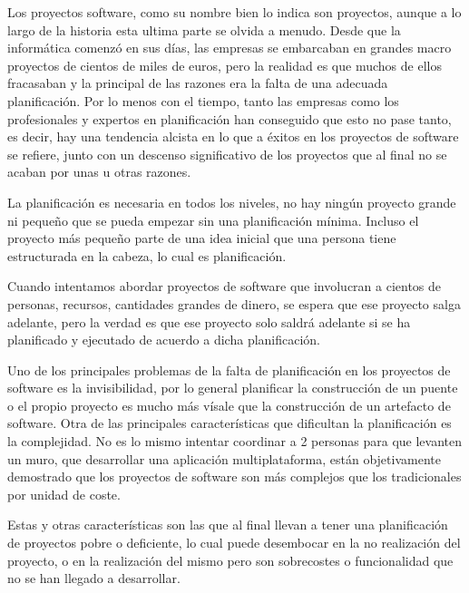 Los proyectos software, como su nombre bien lo indica son proyectos, aunque a lo largo de la historia esta ultima parte se olvida a menudo. Desde que la informática comenzó en sus días, las empresas se embarcaban en grandes macro proyectos de cientos de miles de euros, pero la realidad es que muchos de ellos fracasaban y la principal de las razones era la falta de una adecuada planificación. Por lo menos con el tiempo, tanto las empresas como los profesionales y expertos en planificación han conseguido que esto no pase tanto, es decir, hay una tendencia alcista en lo que a éxitos en los proyectos de software se refiere, junto con un descenso significativo de los proyectos que al final no se acaban por unas u otras razones. 

La planificación es necesaria en todos los niveles, no hay ningún proyecto grande ni pequeño que se pueda empezar sin una planificación mínima. Incluso el proyecto más pequeño parte de una idea inicial que una persona tiene estructurada en la cabeza, lo cual es planificación. 

Cuando intentamos abordar proyectos de software que involucran a cientos de personas, recursos, cantidades grandes de dinero, se espera que ese proyecto salga adelante, pero la verdad es que ese proyecto solo saldrá adelante si se ha planificado y ejecutado de acuerdo a dicha planificación.

Uno de los principales problemas de la falta de planificación en los proyectos de software es la invisibilidad, por lo general planificar la construcción de un puente o el propio proyecto es mucho más vísale que la construcción de un artefacto de software. Otra de las principales características que dificultan la planificación es la complejidad. No es lo mismo intentar coordinar a 2 personas para que levanten un muro, que desarrollar una aplicación multiplataforma, están objetivamente demostrado que los proyectos de software son más complejos que los tradicionales por unidad de coste.

Estas y otras características son las que al final llevan a tener una planificación de proyectos pobre o deficiente, lo cual puede desembocar en la no realización del proyecto, o en la realización del mismo pero son sobrecostes o funcionalidad que no se han llegado a desarrollar. 

